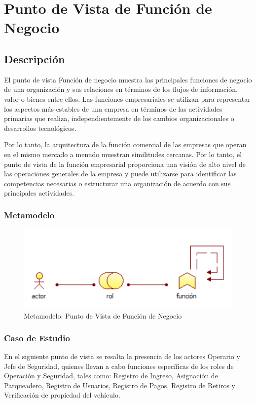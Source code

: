 \section{Punto de Vista de Función de Negocio}
\subsection{Descripción}
El punto de vista Función de negocio muestra las principales funciones de negocio de una organización y sus relaciones en términos de los flujos de información, valor o bienes entre ellos. Las funciones empresariales se utilizan para representar los aspectos más estables de una empresa en términos de las actividades primarias que realiza, independientemente de los cambios organizacionales o desarrollos tecnológicos.

Por lo tanto, la arquitectura de la función comercial de las empresas que operan en el mismo mercado a menudo muestran similitudes cercanas. Por lo tanto, el punto de vista de la función empresarial proporciona una visión de alto nivel de las operaciones generales de la empresa y puede utilizarse para identificar las competencias necesarias o estructurar una organización de acuerdo con sus principales actividades.


\subsubsection{Metamodelo}
\begin{figure}[H]
	\centering
	\includegraphics[width=1.0\textwidth]{imagenes/Metamodelos/Negocio/meta_funcion_negocio.png}
	\caption{Metamodelo: Punto de Vista de Función de Negocio}
	\label{fig:gap_analysis}
\end{figure}



\subsubsection{Caso de Estudio}
En el siguiente punto de vista se resalta la presencia de los actores Operario y Jefe de Seguridad, quienes llevan a cabo funciones específicas de los roles de Operación y Seguridad, tales como: Registro de Ingreso, Asignación de Parqueadero, Registro de Usuarios, Registro de Pagos, Registro de Retiros y Verificación de propiedad del vehículo.

